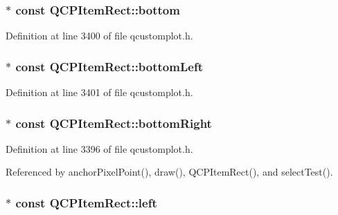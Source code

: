 \subsubsection[{bottom}]{$\ast$ const Q\+C\+P\+Item\+Rect\+::bottom}\label{class_q_c_p_item_rect_a99313bf2b338d9f81e19bd38082038aa}


Definition at line 3400 of file qcustomplot.\+h.

\hypertarget{class_q_c_p_item_rect_abd8ee63fdf81f0c74bf7ccadee8603da}{}
\subsubsection[{bottom\+Left}]{$\ast$ const Q\+C\+P\+Item\+Rect\+::bottom\+Left}\label{class_q_c_p_item_rect_abd8ee63fdf81f0c74bf7ccadee8603da}


Definition at line 3401 of file qcustomplot.\+h.

\hypertarget{class_q_c_p_item_rect_a409f3bfe615a7e322bb3d4d193d85b26}{}
\subsubsection[{bottom\+Right}]{$\ast$ const Q\+C\+P\+Item\+Rect\+::bottom\+Right}\label{class_q_c_p_item_rect_a409f3bfe615a7e322bb3d4d193d85b26}


Definition at line 3396 of file qcustomplot.\+h.



Referenced by anchor\+Pixel\+Point(), draw(), Q\+C\+P\+Item\+Rect(), and select\+Test().

\hypertarget{class_q_c_p_item_rect_aad0ca1af0c8debfc20d7b47fc942764d}{}
\subsubsection[{left}]{$\ast$ const Q\+C\+P\+Item\+Rect\+::left}\label{class_q_c_p_item_rect_aad0ca1af0c8debfc20d7b47fc942764d}


